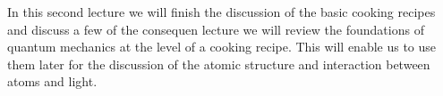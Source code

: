 In this second lecture we will finish the discussion of the basic cooking recipes and discuss a few of the consequen lecture we will review the foundations of quantum mechanics at the level of a cooking recipe. This will enable us to use them later for the discussion of the atomic structure and interaction between atoms and light.